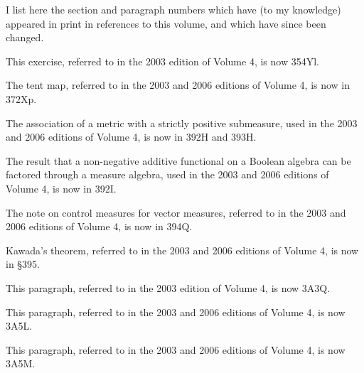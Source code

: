 
\def\chaptername{Concordance}
\def\sectionname{Concordance}

\gdef\bottomparagraph{Concordance}
\noindent{\bf\sectionname}
\smallskip
\let\headlinesectionname=\sectionname

I list here the section and paragraph numbers which have (to my knowledge) appeared in print in references to this volume, and which have since been changed.

\medskip

This exercise, referred to in the 2003 edition of Volume 4, is now 354Yl.

 The tent map, 
referred to in the 2003 and 2006 editions of Volume 4, is now in
372Xp.

 The association of a metric with a strictly positive
submeasure, used in the 2003 and 2006 editions of Volume 4, is now in
392H and 393H.

The result that a non-negative additive functional on a
Boolean algebra can be factored through a measure algebra, used in the 2003
and 2006 editions of Volume 4, is now in 392I.

 The note on control measures for
vector measures, referred to in the
2003 and 2006 editions of Volume 4, is now in 394Q.

 Kawada's theorem, referred to in the 2003 and 2006 
editions of Volume 4, is now in \S395.

 This paragraph, referred to in the 2003 
edition of Volume 4, is now 3A3Q.

 This paragraph, referred to in the 2003
and 2006 editions of Volume 4, is now 3A5L.

 This paragraph, referred to in the 
2003 and 2006 editions of Volume 4, is now 3A5M.

\frnewpage

